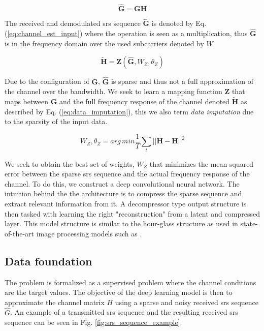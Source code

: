 \begin{equation}\label{eq:channel_est_input}
    \mathbf{\hat{G}} = \mathbf{G} \mathbf{H}
\end{equation}

The received and demodulated \gls{srs} sequence $\mathbf{\hat{G}}$ is denoted by Eq. (\ref{eq:channel_est_input}) where the operation is seen as a multiplication, thus $\mathbf{\hat{G}}$ is in the frequency domain over the used subcarriers denoted by $W$.

\begin{equation}\label{eq:data_imputation}
    \mathbf{\widetilde{H}} =   \mathbf{Z}(\mathbf{\hat{G}},W_Z, \theta_Z)
\end{equation}


Due to the configuration of $\mathbf{G}$, $\mathbf{\hat{G}}$ is sparse and thus not a full approximation of the channel over the bandwidth. We seek to learn a mapping function $\mathbf{Z}$ that maps between $\mathbf{\hat{G}}$ and the full frequency response of the channel denoted $\mathbf{\tilde{H}}$ as described by Eq. (\ref{eq:data_imputation}), this we also term \emph{data imputation} due to the sparsity of the input data.


\begin{equation}\label{eq:loss_function_channel_est}
    W_Z, \theta_Z = {arg\,min} \frac{1}{T}\sum_t || \mathbf{\widetilde{H}} - \mathbf{H}|| ^2
\end{equation}

We seek to obtain the best set of weights, $W_Z$ that minimizes the mean squared error between the sparse \gls{srs} sequence and the actual frequency response of the channel. To do this, we construct a deep convolutional neural network. The intuition behind the the architecture is to compress the sparse sequence and extract relevant information from it. A decompressor type output structure is then tasked with learning the right "reconstruction" from a latent and compressed layer. This model structure is similar to the hour-glass structure as used in state-of-the-art image processing models such as \cite{DeepPrior}. 

\subsection{Data foundation}
The problem is formalized as a supervised problem where the channel conditions are the target values. The objective of the deep learning model is then to approximate the channel matrix $H$ using a sparse and noisy received \gls{srs} sequence $\hat{G}$. An example of a transmitted \gls{srs} sequence and the resulting received \gls{srs} sequence can be seen in Fig. \ref{fig:srs_sequence_example}. 

